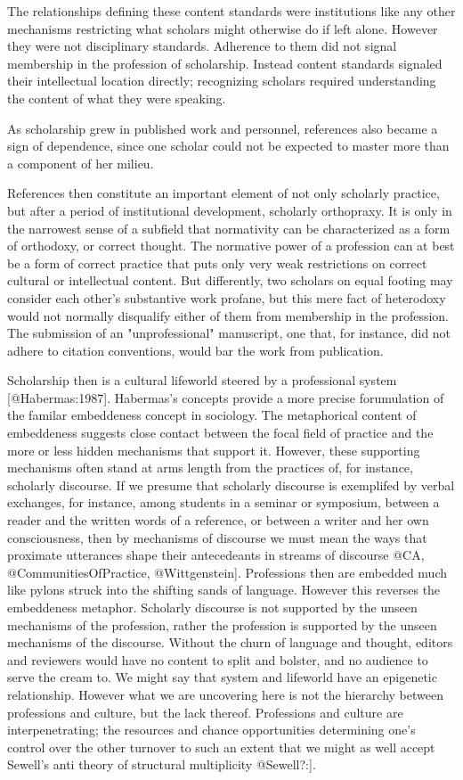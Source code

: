 The relationships defining these content standards were institutions
like any other mechanisms restricting what scholars might otherwise do
if left alone. However they were not disciplinary standards. Adherence
to them did not signal membership in the profession of scholarship.
Instead content standards signaled their intellectual location directly;
recognizing scholars required understanding the content of what they
were speaking.

As scholarship grew in published work and personnel, references also
became a sign of dependence, since one scholar could not be expected to
master more than a component of her milieu.

References then constitute an important element of not only scholarly
practice, but after a period of institutional development, scholarly
orthopraxy. It is only in the narrowest sense of a subfield that
normativity can be characterized as a form of orthodoxy, or correct
thought. The normative power of a profession can at best be a form of
correct practice that puts only very weak restrictions on correct
cultural or intellectual content. But differently, two scholars on equal
footing may consider each other's substantive work profane, but this
mere fact of heterodoxy would not normally disqualify either of them
from membership in the profession. The submission of an "unprofessional"
manuscript, one that, for instance, did not adhere to citation
conventions, would bar the work from publication.

Scholarship then is a cultural lifeworld steered by a professional
system [@Habermas:1987]. Habermas's concepts provide a more precise
forumulation of the familar embeddeness concept in sociology. The
metaphorical content of embeddeness suggests close contact between the
focal field of practice and the more or less hidden mechanisms that
support it. However, these supporting mechanisms often stand at arms
length from the practices of, for instance, scholarly discourse. If we
presume that scholarly discourse is exemplifed by verbal exchanges, for
instance, among students in a seminar or symposium, between a reader and
the written words of a reference, or between a writer and her own
consciousness, then by mechanisms of discourse we must mean the ways
that proximate utterances shape their antecedeants in streams of
discourse @CA, @CommunitiesOfPractice, @Wittgenstein]. Professions then
are embedded much like pylons struck into the shifting sands of
language. However this reverses the embeddeness metaphor. Scholarly
discourse is not supported by the unseen mechanisms of the profession,
rather the profession is supported by the unseen mechanisms of the
discourse. Without the churn of language and thought, editors and
reviewers would have no content to split and bolster, and no audience to
serve the cream to. We might say that system and lifeworld have an
epigenetic relationship. However what we are uncovering here is not the
hierarchy between professions and culture, but the lack thereof.
Professions and culture are interpenetrating; the resources and chance
opportunities determining one's control over the other turnover to such
an extent that we might as well accept Sewell's anti theory of
structural multiplicity @Sewell?:].

